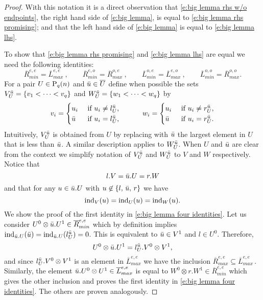 \begin{proof}
	
	
	With this notation it is a direct observation that \eqref{e:big lemma rhs w/o endpoints}, the right hand side of \eqref{e:big lemma}, is equal to \eqref{e:big lemma rhs promising}; and that the left hand side of \eqref{e:big lemma} is equal to \eqref{e:big lemma lhs}.
	
	To show that \eqref{e:big lemma rhs promising} and \eqref{e:big lemma lhs} are equal we need the following identities:
	\begin{equation} \label{e:big lemma four identities}
	\overline{R}_{min}^{e,e} = \overline{L}_{max}^{e,e}\ , \qquad
	\overline{R}_{min}^{e,o} = \overline{R}_{max}^{o,e}\ , \qquad 
	\overline{L}_{min}^{o,e} = \overline{L}_{max}^{e,o}\ , \qquad
	\overline{L}_{min}^{o,o} = \overline{R}_{max}^{o,o}.
	\end{equation}
	For a pair $U \in \P_q(n)$ and $\bu \in \overline{U}$ define when possible the sets $V^\bu_U = \{v_1 < \cdots < v_q\}$ and $W_U^\bu = \{w_1 < \cdots < w_q\}$ by
	\begin{align*}
	v_i = 
	\begin{cases}
	u_i & \text{ if } u_i \neq l_U^\bu, \\
	\bu	& \text{ if } u_i = l_U^\bu,
	\end{cases}
	\qquad \quad
	w_i = 
	\begin{cases}
	u_i & \text{ if } u_i \neq r_U^\bu, \\
	\bu	& \text{ if } u_i = r_U^\bu.
	\end{cases}
	\end{align*}
	Intuitively, $V_U^\bu$ is obtained from $U$ by replacing with $\bu$ the largest element in $U$ that is less than $\bu$.
	A similar description applies to $W_U^\bu$.
	When $U$ and $\bu$ are clear from the context we simplify notation of $V^\bu_U$ and $W^\bu_U$ to $V$ and $W$ respectively.
	Notice that
	\begin{equation*}
	l.V = \bu.U = r.W
	\end{equation*}
	and that for any $u \in \bu.U$ with $u \not \in \{l,\, \bu,\, r\}$ we have
	\begin{equation*}
	\ind_{V}(u) = \ind_{U}(u) = \ind_{W}(u).
	\end{equation*}
	We show the proof of the first identity in \eqref{e:big lemma four identities}.
	Let us consider $U^0 \otimes \bu.U^1 \in \overline{R}_{min}^{e, e}$ which by definition implies $\ind_{\bu.U}(\bu) = \ind_{\bu.U}(l_{U}^\bu) = 0$.
	This is equivalent to $\bu \in V^1$ and $l \in U^0$.
	Therefore, 
	\begin{equation*}
	U^0 \otimes \bu.U^1 =  l_{U}^\bu.V^0 \otimes V^1,
	\end{equation*}
	and since $l_{U}^\bu.V^0 \otimes V^1$ is an element in $\overline{L}_{max}^{e,e}$ we have the inclusion $\overline{R}_{max}^{e,e} \subseteq \overline{L}_{max}^{e,e}$\,.
	Similarly, the element $\bu.U^0 \otimes U^1 \in \overline{L}_{max}^{e,e}$ is equal to $W^0 \otimes r.W^1 \in \overline{R}_{min}^{e,e}$ which gives the other inclusion and proves the first identity in \eqref{e:big lemma four identities}.
	The others are proven analogously.
	

\end{proof}
